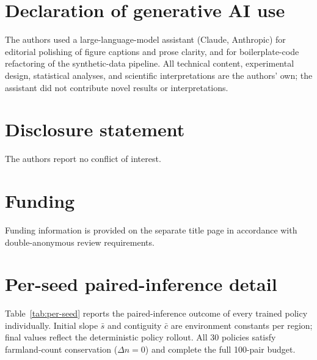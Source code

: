 \documentclass[]{interact}
\theoremstyle{plain}
\begin{document}
\section*{Declaration of generative AI use}

The authors used a large-language-model assistant (Claude, Anthropic) for editorial polishing of figure captions and prose clarity, and for boilerplate-code refactoring of the synthetic-data pipeline. All technical content, experimental design, statistical analyses, and scientific interpretations are the authors' own; the assistant did not contribute novel results or interpretations.

\section*{Disclosure statement}

The authors report no conflict of interest.

\section*{Funding}

Funding information is provided on the separate title page in accordance with double-anonymous review requirements.

\clearpage

\appendix
\section{Per-seed paired-inference detail}\label{app:per-seed}

Table~\ref{tab:per-seed} reports the paired-inference outcome of every trained policy individually. Initial slope $\bar{s}$ and contiguity $\bar{c}$ are environment constants per region; final values reflect the deterministic policy rollout. All 30 policies satisfy farmland-count conservation ($\Delta n = 0$) and complete the full 100-pair budget.
\end{document}
